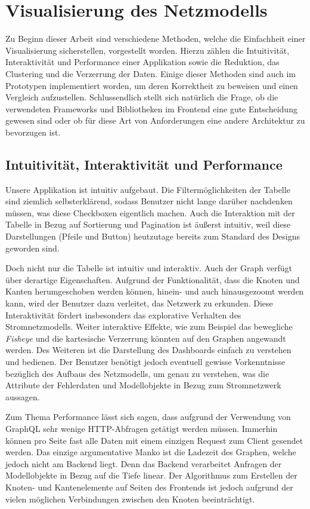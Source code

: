 \section{Visualisierung des Netzmodells}
\label{chp:assessment_frontend}

Zu Beginn dieser Arbeit sind verschiedene Methoden, welche die Einfachheit einer Visualisierung sicherstellen, vorgestellt worden. Hierzu zählen die Intuitivität, Interaktivität und Performance einer Applikation sowie die Reduktion, das Clustering und die Verzerrung der Daten. Einige dieser Methoden sind auch im Prototypen implementiert worden, um deren Korrektheit zu beweisen und einen Vergleich aufzustellen. Schlussendlich stellt sich natürlich die Frage, ob die verwendeten Frameworks und Bibliotheken im Frontend eine gute Entscheidung gewesen sind oder ob für diese Art von Anforderungen eine andere Architektur zu bevorzugen ist.

\subsection{Intuitivität, Interaktivität und Performance}

Unsere Applikation ist intuitiv aufgebaut. Die Filtermöglichkeiten der Tabelle sind ziemlich selbsterklärend, sodass Benutzer nicht lange darüber nachdenken müssen, was diese Checkboxen eigentlich machen. Auch die Interaktion mit der Tabelle in Bezug auf Sortierung und Pagination ist äußerst intuitiv, weil diese Darstellungen (Pfeile und Button) heutzutage bereits zum Standard des Designs geworden sind.

Doch nicht nur die Tabelle ist intuitiv und interaktiv. Auch der Graph verfügt über derartige Eigenschaften. Aufgrund der Funktionalität, dass die Knoten und Kanten herumgeschoben werden können, hinein- und auch hinausgezoomt werden kann, wird der Benutzer dazu verleitet, das Netzwerk zu erkunden. Diese Interaktivität fördert insbesonders das explorative Verhalten des Stromnetzmodells. Weiter interaktive Effekte, wie zum Beispiel das bewegliche \emph{Fisheye} und die kartesische Verzerrung könnten auf den Graphen angewandt werden. Des Weiteren ist die Darstellung des Dashboards einfach zu verstehen und bedienen. Der Benutzer benötigt jedoch eventuell gewisse Vorkenntnisse bezüglich des Aufbaus des Netzmodells, um genau zu verstehen, was die Attribute der Fehlerdaten und Modellobjekte in Bezug zum Stromnetzwerk aussagen.

Zum Thema Performance lässt sich sagen, dass aufgrund der Verwendung von GraphQL sehr wenige HTTP-Abfragen getätigt werden müssen. Immerhin können pro Seite fast alle Daten mit einem einzigen Request zum Client gesendet werden. Das einzige argumentative Manko ist die Ladezeit des Graphen, welche jedoch nicht am Backend liegt. Denn das Backend verarbeitet Anfragen der Modellobjekte in Bezug auf die Tiefe linear. Der Algorithmus zum Erstellen der Knoten- und Kantenelemente auf Seiten des Frontends ist jedoch aufgrund der vielen möglichen Verbindungen zwischen den Knoten beeinträchtigt.

